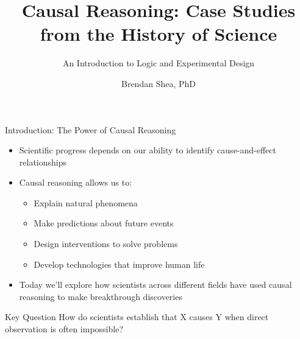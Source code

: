 \documentclass{beamer}
\title{Causal Reasoning: Case Studies from the History of Science}
\subtitle{An Introduction to Logic and Experimental Design}
\author{Brendan Shea, PhD}
\begin{document}
\begin{frame}
    \titlepage
\end{frame}


\begin{frame}{Introduction: The Power of Causal Reasoning}
    \begin{itemize}
        \item Scientific progress depends on our ability to identify cause-and-effect relationships
        \item Causal reasoning allows us to:
            \begin{itemize}
                \item Explain natural phenomena
                \item Make predictions about future events
                \item Design interventions to solve problems
                \item Develop technologies that improve human life
            \end{itemize}
        \item Today we'll explore how scientists across different fields have used causal reasoning to make breakthrough discoveries
    \end{itemize}
    
    \begin{alertblock}{Key Question}
        How do scientists establish that X causes Y when direct observation is often impossible?
    \end{alertblock}
\end{frame}
\end{document}
